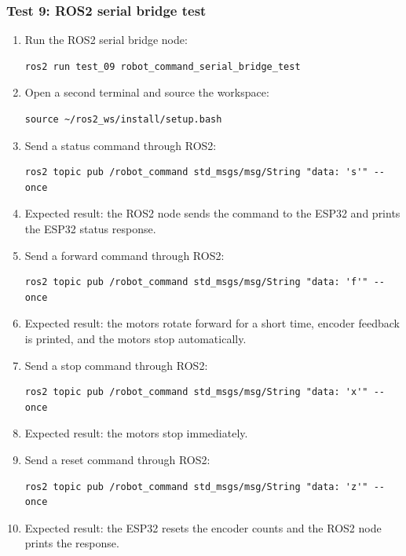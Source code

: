 \documentclass[12pt]{article}
\begin{document}
\subsubsection{Test 9: ROS2 serial bridge test}
\begin{enumerate}
    \item Run the ROS2 serial bridge node:
    \begin{verbatim}
ros2 run test_09 robot_command_serial_bridge_test
    \end{verbatim}
    \item Open a second terminal and source the workspace:
    \begin{verbatim}
source ~/ros2_ws/install/setup.bash
    \end{verbatim}
    \item Send a status command through ROS2:
    \begin{verbatim}
ros2 topic pub /robot_command std_msgs/msg/String "data: 's'" --once
    \end{verbatim}
    \item Expected result: the ROS2 node sends the command to the ESP32 and prints the ESP32 status response.
    \item Send a forward command through ROS2:
    \begin{verbatim}
ros2 topic pub /robot_command std_msgs/msg/String "data: 'f'" --once
    \end{verbatim}
    \item Expected result: the motors rotate forward for a short time, encoder feedback is printed, and the motors stop automatically.
    \item Send a stop command through ROS2:
    \begin{verbatim}
ros2 topic pub /robot_command std_msgs/msg/String "data: 'x'" --once
    \end{verbatim}
    \item Expected result: the motors stop immediately.
    \item Send a reset command through ROS2:
    \begin{verbatim}
ros2 topic pub /robot_command std_msgs/msg/String "data: 'z'" --once
    \end{verbatim}
    \item Expected result: the ESP32 resets the encoder counts and the ROS2 node prints the response.
\end{enumerate}
\end{document}
